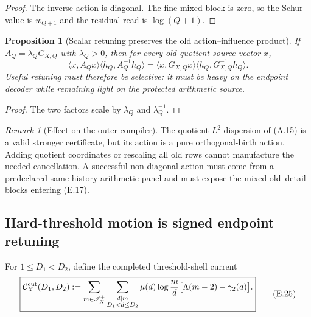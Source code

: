 \documentclass[11pt]{article}
\newtheorem{proposition}[theorem]{Proposition}
\theoremstyle{definition}
\theoremstyle{remark}
\newtheorem{remark}[theorem]{Remark}
\begin{document}
\begin{proof}
The inverse action is diagonal.  The fine mixed block is zero, so the Schur
value is $w_{Q+1}$ and the residual read is $\log(Q+1)$.
\end{proof}

\begin{proposition}[Scalar retuning preserves the old action--influence product]
\label{prop:affend-scalar-retuning}
If $A_Q=\lambda_QG_{X,Q}$ with $\lambda_Q>0$, then for every old quotient
source vector $x$,
\begin{equation}
 \label{eq:affend-scalar-retuning}
 \boxed{
 \langle x,A_Qx\rangle
 \langle h_Q,A_Q^{-1}h_Q\rangle
 =\langle x,G_{X,Q}x\rangle
  \langle h_Q,G_{X,Q}^{-1}h_Q\rangle.}
 \tag{E.24}
\end{equation}
Useful retuning must therefore be selective: it must be heavy on the endpoint
decoder while remaining light on the protected arithmetic source.
\end{proposition}

\begin{proof}
The two factors scale by $\lambda_Q$ and $\lambda_Q^{-1}$.
\end{proof}

\begin{remark}[Effect on the outer compiler]
The quotient $L^2$ dispersion of \textup{(A.15)} is a valid stronger certificate, but
its action is a pure orthogonal-birth action.  Adding quotient coordinates or
rescaling all old rows cannot manufacture the needed cancellation.  A
successful non-diagonal action must come from a predeclared same-history
arithmetic panel and must expose the mixed old--detail blocks entering
\textup{(E.17)}.
\end{remark}

\subsection{Hard-threshold motion is signed endpoint retuning}
\label{subsec:affend-threshold-retuning}

For $1\le D_1<D_2$, define the completed threshold-shell current
\begin{equation}
 \label{eq:affend-threshold-shell}
 \boxed{
 \begin{aligned}
 \mathcal C_X^{\rm cut}(D_1,D_2)
 :=\sum_{m\in\mathscr I_X^+}
 \sum_{\substack{d\mid m\\D_1<d\le D_2}}
 \mu(d)\log\frac md
 \bigl[\Lambda(m-2)-\gamma_2(d)\bigr].
 \end{aligned}}
 \tag{E.25}
\end{equation}
\end{document}
